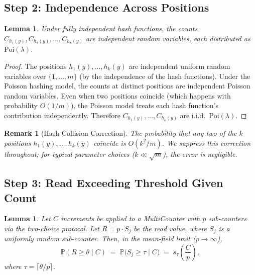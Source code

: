 \documentclass[11pt,a4paper]{article}
\newtheorem{lemma}[theorem]{Lemma}
\newtheorem{remark}[theorem]{Remark}
\newcommand{\Poi}{\mathrm{Poi}}
\newcommand{\Prob}{\mathbb{P}}
\begin{document}
\subsection{Step 2: Independence Across Positions}
\label{ssec:fpr-step2}

\begin{lemma}\label{lem:independence}
Under fully independent hash functions, the counts
$C_{h_1(y)}, C_{h_2(y)}, \ldots, C_{h_k(y)}$ are independent random
variables, each distributed as $\Poi(\lambda)$.
\end{lemma}

\begin{proof}
The positions $h_1(y), \ldots, h_k(y)$ are independent uniform random
variables over $\{1, \ldots, m\}$ (by the independence of the hash
functions).  Under the Poisson hashing model, the counts at distinct
positions are independent Poisson random variables.  Even when two
positions coincide (which happens with probability $O(1/m)$), the Poisson
model treats each hash function's contribution independently.  Therefore
$C_{h_1(y)}, \ldots, C_{h_k(y)}$ are i.i.d.\ $\Poi(\lambda)$.
\end{proof}

\begin{remark}[Hash Collision Correction]\label{rem:hash-collision}
The probability that any two of the $k$ positions $h_1(y), \ldots, h_k(y)$
coincide is $O(k^2/m)$.  We suppress this correction throughout; for
typical parameter choices ($k \ll \sqrt{m}$), the error is negligible.
\end{remark}

\subsection{Step 3: Read Exceeding Threshold Given Count}
\label{ssec:fpr-step3}

\begin{lemma}\label{lem:read-threshold}
Let $C$ increments be applied to a MultiCounter with $p$ sub-counters
via the two-choice protocol.  Let $R = p \cdot S_j$ be the read value,
where $S_j$ is a uniformly random sub-counter.  Then, in the mean-field
limit ($p \to \infty$),
\begin{equation}\label{eq:read-prob}
  \Prob(R \ge \theta \mid C)
  \;=\; \Prob\!\bigl(S_j \ge \tau \mid C\bigr)
  \;=\; s_\tau\!\left(\frac{C}{p}\right),
\end{equation}
where $\tau = \lceil \theta / p \rceil$.
\end{lemma}
\end{document}
